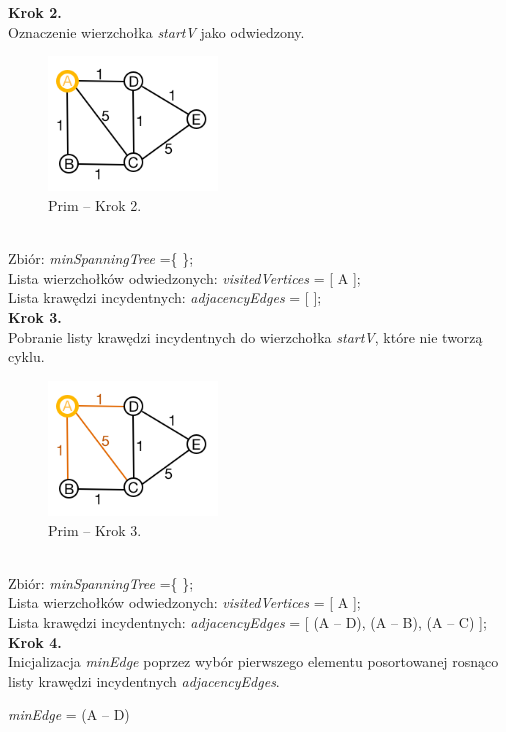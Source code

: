 \textbf{Krok 2.}\\
Oznaczenie wierzchołka \emph{startV} jako odwiedzony. 
\begin{figure}[htb!]
	\centering
	\includegraphics[width=0.4\textwidth]{tex/fig/graf2}
	\caption{Prim -- Krok 2.}
	\label{fig: g2}
\end{figure}\\
Zbiór: \emph{minSpanningTree} =\{ \};\\
Lista wierzchołków odwiedzonych: \emph{visitedVertices} = [ A ];\\
Lista krawędzi incydentnych: \emph{adjacencyEdges} = [ ];\\

\textbf{Krok 3.}\\
Pobranie listy krawędzi incydentnych do wierzchołka \emph{startV}, które nie tworzą cyklu. 
\begin{figure}[htb!]
	\centering
	\includegraphics[width=0.4\textwidth]{tex/fig/graf3}
	\caption{Prim -- Krok 3.}
	\label{fig: g3}
\end{figure}\\
Zbiór: \emph{minSpanningTree} =\{ \};\\
Lista wierzchołków odwiedzonych: \emph{visitedVertices} = [ A ];\\
Lista krawędzi incydentnych: \emph{adjacencyEdges} = [ (A -- D), (A -- B), (A -- C) ];\\

\textbf{Krok 4.}\\
Inicjalizacja \emph{minEdge} poprzez wybór pierwszego elementu posortowanej rosnąco listy krawędzi incydentnych \emph{adjacencyEdges}.\\
 \begin{center}
 	\emph{minEdge} = (A -- D)
 \end{center}

